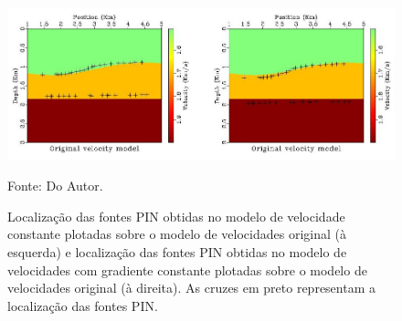 \begin{figure}[H]
\caption{Localização das fontes PIN obtidas no modelo de velocidade constante
plotadas sobre o modelo de velocidades original (à esquerda)
e localização das fontes PIN obtidas no modelo de velocidades com gradiente constante
plotadas sobre o modelo de velocidades original (à direita).
As cruzes em preto representam a localização das fontes PIN.}
\begin{center}
\includegraphics[scale=2]{images/resultinv.jpeg}
\vspace{-0.3cm}
\end{center}
\begin{center}
 Fonte: Do Autor.
\end{center}
\label{fig:10.5}
\end{figure}
